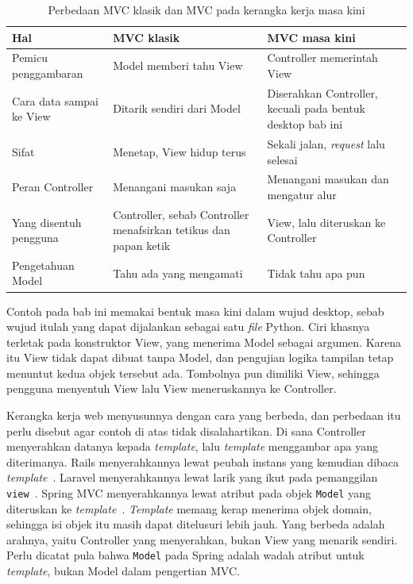 \begin{table}[htbp]
  \centering
  \caption{Perbedaan MVC klasik dan MVC pada kerangka kerja masa kini}
  \label{tab:dua-mvc}
  \begin{tabularx}{\textwidth}{|l|X|X|}
    \hline
    \textbf{Hal} & \textbf{MVC klasik} & \textbf{MVC masa kini} \\
    \hline
    Pemicu penggambaran & Model memberi tahu View & Controller memerintah View \\
    \hline
    Cara data sampai ke View & Ditarik sendiri dari Model & Diserahkan Controller, kecuali pada bentuk desktop bab ini \\
    \hline
    Sifat & Menetap, View hidup terus & Sekali jalan, \textit{request} lalu selesai \\
    \hline
    Peran Controller & Menangani masukan saja & Menangani masukan dan mengatur alur \\
    \hline
    Yang disentuh pengguna & Controller, sebab Controller menafsirkan tetikus dan papan ketik & View, lalu diteruskan ke Controller \\
    \hline
    Pengetahuan Model & Tahu ada yang mengamati & Tidak tahu apa pun \\
    \hline
  \end{tabularx}
\end{table}

Contoh pada bab ini memakai bentuk masa kini dalam wujud desktop, sebab wujud
itulah yang dapat dijalankan sebagai satu \textit{file} Python. Ciri khasnya terletak
pada konstruktor View, yang menerima Model sebagai argumen. Karena itu View
tidak dapat dibuat tanpa Model, dan pengujian logika tampilan tetap menuntut
kedua objek tersebut ada. Tombolnya pun dimiliki View, sehingga pengguna
menyentuh View lalu View meneruskannya ke Controller.

Kerangka kerja web menyusunnya dengan cara yang berbeda, dan perbedaan itu perlu
disebut agar contoh di atas tidak disalahartikan. Di sana Controller menyerahkan
datanya kepada \textit{template}, lalu \textit{template} menggambar apa yang diterimanya. Rails
menyerahkannya lewat peubah instans yang kemudian dibaca
\textit{template}~\cite{rails2026controller}. Laravel menyerahkannya lewat larik yang ikut
pada pemanggilan \texttt{view}~\cite{laravel2026views}. Spring MVC
menyerahkannya lewat atribut pada objek \texttt{Model} yang diteruskan ke
\textit{template}~\cite{spring2026model}. \textit{Template} memang kerap menerima objek domain,
sehingga isi objek itu masih dapat ditelusuri lebih jauh. Yang berbeda adalah
arahnya, yaitu Controller yang menyerahkan, bukan View yang menarik sendiri.
Perlu dicatat pula bahwa \texttt{Model} pada Spring adalah wadah atribut untuk
\textit{template}, bukan Model dalam pengertian MVC.

